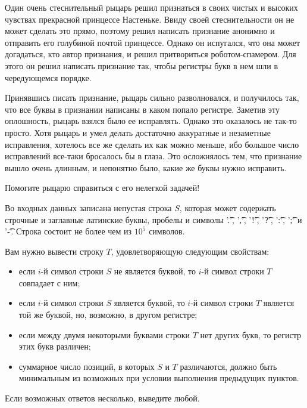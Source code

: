 Один очень стеснительный рыцарь решил признаться в своих чистых и высоких чувствах прекрасной принцессе Настеньке. Ввиду своей стеснительности он не может сделать это прямо, поэтому решил написать признание анонимно и отправить его голубиной почтой принцессе. Однако он испугался, что она может догадаться, кто автор признания, и решил притвориться роботом-спамером. Для этого он решил написать признание так, чтобы регистры букв в нем шли в чередующемся порядке. 

Принявшись писать признание, рыцарь сильно разволновался, и получилось так, что все буквы в признании написаны в каком попало регистре. Заметив эту оплошность, рыцарь взялся было ее исправлять. Однако это оказалось не так-то просто. Хотя рыцарь и умел делать достаточно аккуратные и незаметные исправления, хотелось все же сделать их как можно меньше, ибо большое число исправлений все-таки бросалось бы в глаза. Это осложнялось тем, что признание вышло очень длинным, и непонятно было, какие же буквы нужно исправить. 

Помогите рыцарю справиться с его нелегкой задачей! 


\InputFile

Во входных данных записана непустая строка $S$, которая может содержать строчные и заглавные латинские буквы, пробелы и символы '\t{.}', '\t{,}', '\t{!}', '\t{?}', '\t{:}', '\t{;}' и '\t{-}'. Строка состоит не более чем из $10^5$ символов. 

\OutputFile

Вам нужно вывести строку $T$, удовлетворяющую следующим свойствам: 
\begin{itemize}
\item если $i$-й символ строки $S$ не является буквой, то $i$-й символ строки $T$ совпадает с ним; 
\item если $i$-й символ строки $S$ является буквой, то $i$-й символ строки $T$ является той же буквой, но, возможно, в другом регистре; 
\item если между двумя некоторыми буквами строки $T$ нет других букв, то регистр этих букв различен; 
\item суммарное число позиций, в которых $S$ и $T$ различаются, должно быть минимальным из возможных при условии выполнения предыдущих пунктов. 
\end{itemize}

Если возможных ответов несколько, выведите любой. 

\SAMPLES
